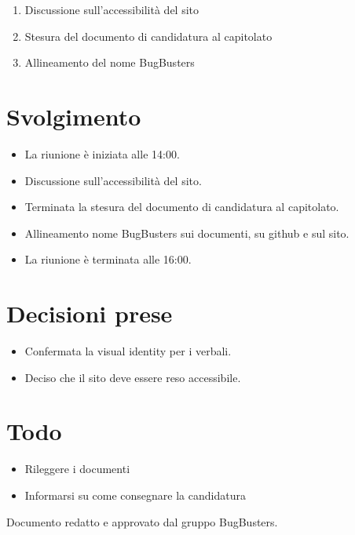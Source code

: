\documentclass[a4paper,12pt]{article}
\begin{document}
\begin{enumerate}
    \item Discussione sull'accessibilità del sito
    \item Stesura del documento di candidatura al capitolato
    \item Allineamento del nome BugBusters
\end{enumerate}

\section{Svolgimento}

\begin{itemize}
    \item La riunione è iniziata alle 14:00.
    \item Discussione sull'accessibilità del sito.
    \item Terminata la stesura del documento di candidatura al capitolato.
    \item Allineamento nome BugBusters sui documenti, su github e sul sito.
    \item La riunione è terminata alle 16:00.
\end{itemize}

\section{Decisioni prese}

\begin{itemize}
    \item Confermata la visual identity per i verbali.
    \item Deciso che il sito deve essere reso accessibile.
\end{itemize}

\section{Todo}

\begin{tcolorbox}[colback=secondaryblue!8,colframe=secondaryblue!60,arc=2mm,boxrule=0.5pt,left=10pt,right=10pt]
\begin{itemize}[topsep=5pt]
    \item Rileggere i documenti
    \item Informarsi su come consegnare la candidatura
\end{itemize}
\end{tcolorbox}

\vfill
\begin{center}
    {\small\color{darkgray} Documento redatto e approvato dal gruppo BugBusters.}
\end{center}
\end{document}
